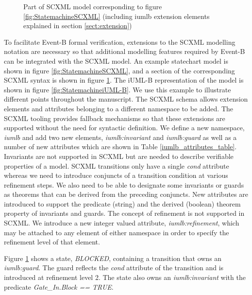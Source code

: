 \begin{figure}[tbp!]
  \caption{Part of SCXML model corresponding to figure \ref{fig:StatemachineSCXML} 
   (including iumlb extension elements explained in section \ref{sect:extension}) } 
  \label{fig:scxml}
\end{figure}

To facilitate Event-B formal verification, extensions to the SCXML 
modelling notation are necessary so that additional modelling features 
required by Event-B can be integrated with the SCXML model.
An example statechart model is shown in figure \ref{fig:StatemachineSCXML}, and a section of the corresponding SCXML syntax is shown in figure \ref{fig:scxml}. The iUML-B representation of the model is shown in figure \ref{fig:StatemachineiUML-B}. 
We use this example to illustrate different points throughout the manuscript.
The SCXML schema allows extension elements and attributes belonging 
to a different namespace to be added. 
The SCXML tooling provides fallback mechanisms so that these extensions are supported 
without the need for syntactic definition. We define a new namespace,  
\emph{iumlb} and add two new elements, \emph{iumlb:invariant} and 
\emph{iumlb:guard} as well as a 
number of new attributes which are shown in Table \ref{iumlb_attributes_table}.
Invariants are not supported in SCXML but are needed to describe 
verifiable properties of a model. 
SCXML transitions only have a single \emph{cond} attribute whereas we need to introduce conjuncts of a transition
condition at various refinement steps. 
We also need to be able to designate some 
invariants or guards as theorems that can be derived from the preceding conjuncts. 
New attributes are introduced to support the predicate (string) and the 
derived (boolean) theorem property of invariants and guards. The concept 
of refinement is not supported in SCXML. We introduce a new integer valued 
attribute, \emph{iumlb:refinement}, which may be attached to any element of 
either namespace in order to specify the refinement level of that element. 


Figure \ref{fig:scxml} shows a state, \emph{BLOCKED}, 
containing a transition that owns an \emph{iumlb:guard}.
The guard reflects the \emph{cond} attribute of the transition 
and is introduced at refinement level 2. 
The state also owns an \emph{iumlb:invariant} with the predicate
 \emph{Gate\_In.Block == TRUE}.



